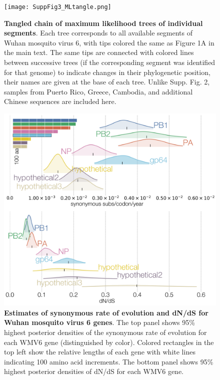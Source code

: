 \documentclass[11pt,twocolumn]{article}
\begin{document}
\begin{figure}
\centering
\texttt{[image: SuppFig3\_MLtangle.png]}
\caption{
\textbf{Tangled chain of maximum likelihood trees of individual segments}.
Each tree corresponds to all available segments of Wuhan mosquito virus 6, with tips colored the same as Figure 1A in the main text.
The same tips are connected with colored lines between successive trees (if the corresponding segment was identified for that genome) to indicate changes in their phylogenetic position, their names are given at the base of each tree.
Unlike Supp. Fig. 2, samples from Puerto Rico, Greece, Cambodia, and additional Chinese sequences are included here.
}
\end{figure}


\begin{figure}
\centering
\includegraphics[width=\textwidth]{SuppFig4_synDNDS.png}
\caption{
\textbf{Estimates of synonymous rate of evolution and dN/dS for Wuhan mosquito virus 6 genes}.
The top panel shows 95\% highest posterior densities of the synonymous rate of evolution for each WMV6 gene (distinguished by color).
Colored rectangles in the top left show the relative lengths of each gene with white lines indicating 100 amino acid increments.
The bottom panel shows 95\% highest posterior densities of dN/dS for each WMV6 gene.
}
\end{figure}
\end{document}
